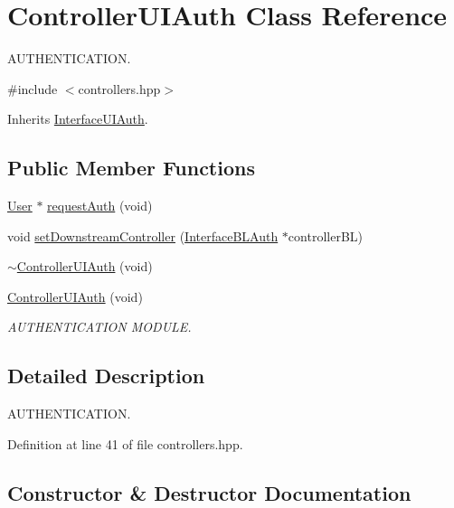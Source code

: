 \hypertarget{class_controller_u_i_auth}{}\section{Controller\+U\+I\+Auth Class Reference}
\label{class_controller_u_i_auth}


A\+U\+T\+H\+E\+N\+T\+I\+C\+A\+T\+I\+ON.  




{\ttfamily \#include $<$controllers.\+hpp$>$}



Inherits \hyperlink{class_interface_u_i_auth}{Interface\+U\+I\+Auth}.

\subsection*{Public Member Functions}
\begin{DoxyCompactItemize}
\item 
\hyperlink{class_user}{User} $\ast$ \hyperlink{class_controller_u_i_auth_afb3e3fe781985fe7c7977b2c151dcd7a}{request\+Auth} (void)
\item 
void \hyperlink{class_controller_u_i_auth_a38a73726a7a7d7909cf078dd781d9dc3}{set\+Downstream\+Controller} (\hyperlink{class_interface_b_l_auth}{Interface\+B\+L\+Auth} $\ast$controller\+BL)
\item 
\hyperlink{class_controller_u_i_auth_a6dcb9a195d76fc56d89d30af5da3ed72}{$\sim$\+Controller\+U\+I\+Auth} (void)
\item 
\hyperlink{class_controller_u_i_auth_a0976b0902249eebb55d7e449797c8545}{Controller\+U\+I\+Auth} (void)
\begin{DoxyCompactList}\small\item\em A\+U\+T\+H\+E\+N\+T\+I\+C\+A\+T\+I\+ON M\+O\+D\+U\+LE. \end{DoxyCompactList}\end{DoxyCompactItemize}


\subsection{Detailed Description}
A\+U\+T\+H\+E\+N\+T\+I\+C\+A\+T\+I\+ON. 

Definition at line 41 of file controllers.\+hpp.



\subsection{Constructor \& Destructor Documentation}
\mbox{\label{class_controller_u_i_auth_a6dcb9a195d76fc56d89d30af5da3ed72}} 
